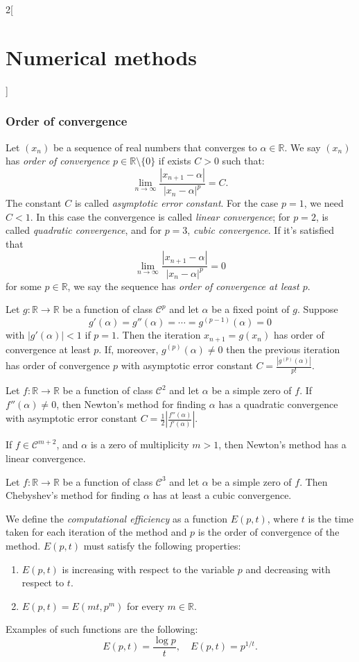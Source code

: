 \documentclass[class=article,10pt,crop=false]{standalone}
\begin{document}
\begin{multicols}{2}[\section{Numerical methods}]
\subsubsection*{Order of convergence}
\begin{definition}
Let $(x_n)$ be a sequence of real numbers that converges to $\alpha\in\mathbb{R}$. We say $(x_n)$ has \textit{order of convergence $p\in\mathbb{R}\setminus\{0\}$} if exists $C>0$ such that: $$\lim_{n\to\infty}\frac{|x_{n+1}-\alpha|}{|x_n-\alpha|^p}=C.$$ The constant $C$ is called \textit{asymptotic error constant}. For the case $p=1$, we need $C<1$. In this case the convergence is called \textit{linear convergence}; for $p=2$, is called \textit{quadratic convergence}, and for $p=3$, \textit{cubic convergence}. If it's satisfied that $$\lim_{n\to\infty}\frac{|x_{n+1}-\alpha|}{|x_n-\alpha|^p}=0$$ for some $p\in\mathbb{R}$, we say the sequence has \textit{order of convergence at least $p$}.
\end{definition}
\begin{theorem}
Let $g:\mathbb{R}\rightarrow\mathbb{R}$ be a function of class $\mathcal{C}^p$ and let $\alpha$ be a fixed point of $g$. Suppose $$g'(\alpha)=g''(\alpha)=\cdots=g^{(p-1)}(\alpha)=0$$ with $|g'(\alpha)|<1$ if $p=1$. Then the iteration $x_{n+1}=g(x_n)$ has order of convergence at least $p$. If, moreover, $g^{(p)}(\alpha)\ne0$ then the previous iteration has order of convergence $p$ with asymptotic error constant $C=\frac{|g^{(p)}(\alpha)|}{p!}$.
\end{theorem}
\begin{theorem}
Let $f:\mathbb{R}\rightarrow\mathbb{R}$ be a function of class $\mathcal{C}^2$ and let $\alpha$ be a simple zero of $f$. If $f''(\alpha)\ne0$, then Newton's method for finding $\alpha$ has a quadratic convergence with asymptotic error constant $C=\frac{1}{2}\left|\frac{f''(\alpha)}{f'(\alpha)}\right|$.\par If $f\in\mathcal{C}^{m+2}$, and $\alpha$ is a zero of multiplicity $m>1$, then Newton's method has a linear convergence.
\end{theorem}
\begin{theorem}
Let $f:\mathbb{R}\rightarrow\mathbb{R}$ be a function of class $\mathcal{C}^3$ and let $\alpha$ be a simple zero of $f$. Then Chebyshev's method for finding $\alpha$ has at least a cubic convergence.
\end{theorem}
\begin{definition}
We define the \textit{computational efficiency} as a function $E(p,t)$, where $t$ is the time taken for each iteration of the method and $p$ is the order of convergence of the method. $E(p,t)$ must satisfy the following properties:
\begin{enumerate}
    \item $E(p,t)$ is increasing with respect to the variable $p$ and decreasing with respect to $t$.
    \item $E(p,t)=E(mt,p^m)$ for every $m\in\mathbb{R}$.
\end{enumerate}
Examples of such functions are the following: $$E(p,t)=\frac{\log p}{t},\quad E(p,t)=p^{1/t}.$$
\end{definition}

\end{multicols}
\end{document}
